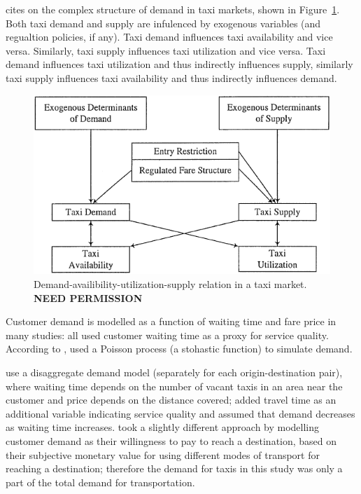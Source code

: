 \textcite{Yang2002taxi+demand} cites \textcite{Manski1967taxi+demand} on the
complex structure of demand in taxi markets, shown in Figure~\ref{figure:taxi}.
Both taxi demand and supply are infulenced by exogenous variables (and
regualtion policies, if any). Taxi demand influences taxi availability and vice
versa. Similarly, taxi supply influences taxi utilization and vice versa. Taxi
demand influences taxi utilization and thus indirectly influences supply,
similarly taxi supply influences taxi availability and thus indirectly
influences demand.

\begin{figure}
  \begin{center}
    \includegraphics{../figures/taxi_demand}
    \caption{
      Demand-availibility-utilization-supply relation in a taxi market. 
      \textbf{NEED PERMISSION}
      \label{figure:taxi}
    }
  \end{center}
\end{figure}

Customer demand is modelled as a function of waiting time and fare price in
many studies: \textcite{Douglas1972taxi+regulation, Devany1975taxi+capacity,
Cairns1996taxi+competition, Yang2002taxi+demand} all used customer waiting time
as a proxy for service quality. According to
\textcite{Salanova2011taxi+review}, \textcite{Manski1967taxi+demand} used a
Poisson process (a stohastic function) to simulate demand.

\textcite{Yang2002taxi+demand} use a disaggregate demand model (separately for
each origin-destination pair), where waiting time depends on the number of
vacant taxis in an area near the customer and price depends on the distance
covered; \textcite{Yang2010taxi+nonlinear} added travel time as an additional
variable indicating service quality and assumed that demand decreases as
waiting time increases. \textcite{Yang2010taxi+equilibria} took a slightly
different approach by modelling customer demand as their willingness to pay to
reach a destination, based on their subjective monetary value for using
different modes of transport for reaching a destination; therefore the demand
for taxis in this study was only a part of the total demand for transportation.
